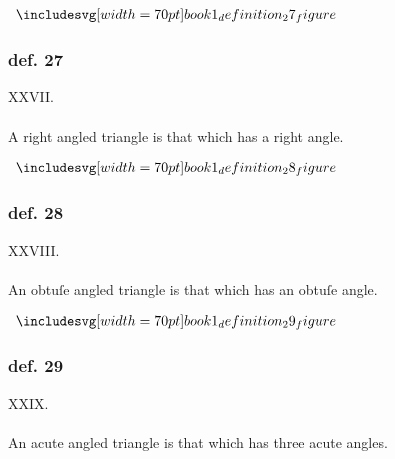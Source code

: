 \pagebreak

\begin{minipage}{0.33\textwidth}
    \begin{center}
        $\img[0][0][70]{book1_definition_27_figure}$
    \end{center}
\end{minipage}%
\begin{minipage}{0.67\textwidth}
    \subsubsection{def. 27}
    \begin{center}
        XXVII.\label{book1def27}\\
        \hfill\\
        A right angled triangle is that which has a right angle.
    \end{center}
\end{minipage}

\hfill

\begin{minipage}{0.33\textwidth}
    \begin{center}
        $\img[0][0][70]{book1_definition_28_figure}$
    \end{center}
\end{minipage}%
\begin{minipage}{0.67\textwidth}
    \subsubsection{def. 28}
    \begin{center}
        XXVIII.\label{book1def28}\\
        \hfill\\
        An obtuſe angled triangle is that which has an obtuſe angle.
    \end{center}
\end{minipage}

\hfill

\begin{minipage}{0.33\textwidth}
    \begin{center}
        $\img[0][0][70]{book1_definition_29_figure}$
    \end{center}
\end{minipage}%
\begin{minipage}{0.67\textwidth}
    \subsubsection{def. 29}
    \begin{center}
        XXIX.\label{book1def29}\\
        \hfill\\
        An acute angled triangle is that which has three acute angles.
    \end{center}
\end{minipage}

